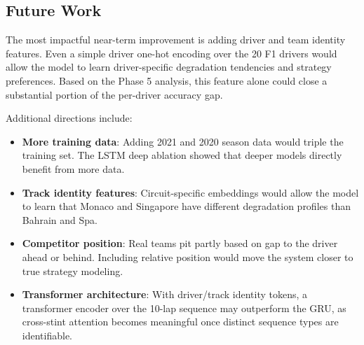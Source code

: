 \documentclass[12pt]{article}
\begin{document}
\subsection{Future Work}

The most impactful near-term improvement is adding driver and team identity features. Even a simple driver one-hot encoding over the 20 F1 drivers would allow the model to learn driver-specific degradation tendencies and strategy preferences. Based on the Phase 5 analysis, this feature alone could close a substantial portion of the per-driver accuracy gap.

Additional directions include:
\begin{itemize}[noitemsep]
    \item \textbf{More training data}: Adding 2021 and 2020 season data would triple the training set. The LSTM deep ablation showed that deeper models directly benefit from more data.
    \item \textbf{Track identity features}: Circuit-specific embeddings would allow the model to learn that Monaco and Singapore have different degradation profiles than Bahrain and Spa.
    \item \textbf{Competitor position}: Real teams pit partly based on gap to the driver ahead or behind. Including relative position would move the system closer to true strategy modeling.
    \item \textbf{Transformer architecture}: With driver/track identity tokens, a transformer encoder \cite{vaswani2017} over the 10-lap sequence may outperform the GRU, as cross-stint attention becomes meaningful once distinct sequence types are identifiable.
\end{itemize}
\end{document}
